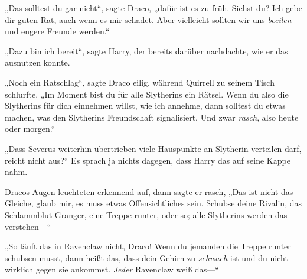 „Das solltest du gar nicht“, sagte Draco, „dafür ist es zu früh. Siehst du? Ich gebe dir guten Rat, auch wenn es mir schadet. Aber vielleicht sollten wir uns \emph{beeilen} und engere Freunde werden.“

„Dazu bin ich bereit“, sagte Harry, der bereits darüber nachdachte, wie er das ausnutzen konnte.

„Noch ein Ratschlag“, sagte Draco eilig, während Quirrell zu seinem Tisch schlurfte. „Im Moment bist du für alle Slytherins ein Rätsel. Wenn du also die Slytherins für dich einnehmen willst, wie ich annehme, dann solltest du etwas machen, was den Slytherins Freundschaft signalisiert. Und zwar \emph{rasch}, also heute oder morgen.“

„Dass Severus weiterhin übertrieben viele Hauspunkte an Slytherin verteilen darf, reicht nicht aus?“ Es sprach ja nichts dagegen, dass Harry das auf seine Kappe nahm.

Dracos Augen leuchteten erkennend auf, dann sagte er rasch, „Das ist nicht das Gleiche, glaub mir, es muss etwas Offensichtliches sein. Schubse deine Rivalin, das Schlammblut Granger, eine Treppe runter, oder so; alle Slytherins werden das verstehen—“

„So läuft das in Ravenclaw nicht, Draco! Wenn du jemanden die Treppe runter schubsen musst, dann heißt das, dass dein Gehirn zu \emph{schwach} ist und du nicht wirklich gegen sie ankommst. \emph{Jeder} Ravenclaw weiß das—“

